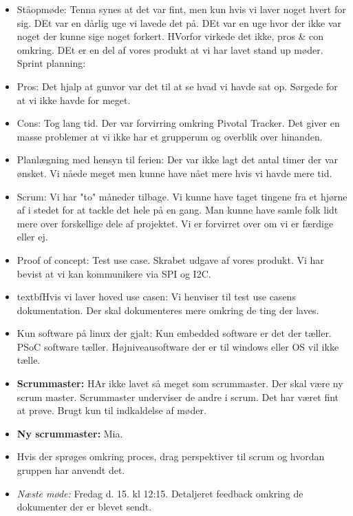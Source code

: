 \documentclass{article}
\begin{document}
\begin{itemize}
	
	{\large Retrospective}
	\item Ståopmøde: Tenna synes at det var fint, men kun hvis vi laver noget hvert for sig. DEt var en dårlig uge vi lavede det på. DEt var en uge hvor der ikke var noget der kunne sige noget forkert. HVorfor virkede det ikke, pros \& con omkring. DEt er en del af vores produkt at vi har lavet stand up møder. 
	Sprint planning: 
	\item Pros: Det hjalp at gunvor var det til at se hvad vi havde sat op. Sørgede for at vi ikke havde for meget.
	\item Cons: Tog lang tid. Der var forvirring omkring Pivotal Tracker. Det giver en masse problemer at vi ikke har et grupperum og overblik over hinanden.
	\item Planlægning med hensyn til ferien: Der var ikke lagt det antal timer der var ønsket. Vi nåede meget men kunne have nået mere hvis vi havde mere tid.
	\item Scrum: Vi har "to" måneder tilbage. Vi kunne have taget tingene fra et hjørne af i stedet for at tackle det hele på en gang. Man kunne have samle folk lidt mere over forskellige dele af projektet. Vi er forvirret over om vi er færdige eller ej.
	\item Proof of concept: Test use case. Skrabet udgave af vores produkt. Vi har bevist at vi kan kommunikere via SPI og I2C.
	\item textbf{Hvis vi laver hoved use casen}: Vi henviser til test use casens dokumentation. Der skal dokumenteres mere omkring de ting der laves. 
	
	\item Kun software på linux der gjalt: Kun embedded software er det der tæller. PSoC software tæller. Højniveausoftware der er til windows eller OS vil ikke tælle.
	
	\item \textbf{Scrummaster: } HAr ikke lavet så meget som scrummaster. Der skal være ny scrum master. Scrummaster underviser de andre i scrum. Det har været fint at prøve. Brugt kun til indkaldelse af møder. 
	\item \textbf{Ny scrummaster: } Mia.
	\item Hvis der sprøges omkring proces, drag perspektiver til scrum og hvordan gruppen har anvendt det.
	
	\item \textit{Næste møde:} Fredag d. 15. kl 12:15. 
	\subitem Detaljeret feedback omkring de dokumenter der er blevet sendt.
	
	\end{itemize}
\end{document}
